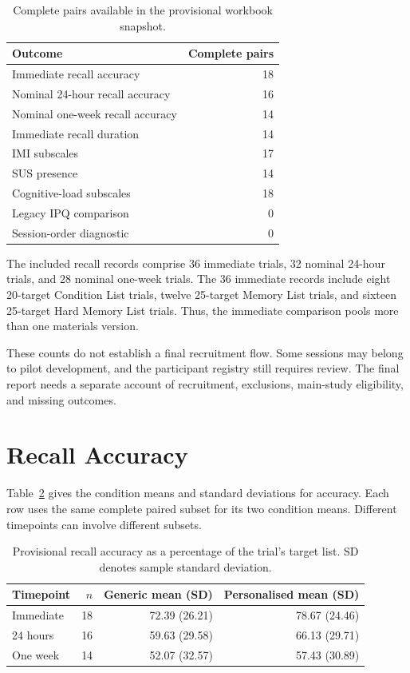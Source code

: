\begin{table}[htbp]
\centering
\caption{Complete pairs available in the provisional workbook snapshot.}
\label{tab:coverage}
\begin{tabular}{lr}
\toprule
Outcome & Complete pairs \\
\midrule
Immediate recall accuracy & 18 \\
Nominal 24-hour recall accuracy & 16 \\
Nominal one-week recall accuracy & 14 \\
Immediate recall duration & 14 \\
IMI subscales & 17 \\
SUS presence & 14 \\
Cognitive-load subscales & 18 \\
Legacy IPQ comparison & 0 \\
Session-order diagnostic & 0 \\
\bottomrule
\end{tabular}
\end{table}

The included recall records comprise 36 immediate trials, 32 nominal 24-hour trials, and 28 nominal one-week trials. The 36 immediate records include eight 20-target Condition List trials, twelve 25-target Memory List trials, and sixteen 25-target Hard Memory List trials. Thus, the immediate comparison pools more than one materials version.

These counts do not establish a final recruitment flow. Some sessions may belong to pilot development, and the participant registry still requires review. The final report needs a separate account of recruitment, exclusions, main-study eligibility, and missing outcomes.

\section{Recall Accuracy}
Table~\ref{tab:recallmeans} gives the condition means and standard deviations for accuracy. Each row uses the same complete paired subset for its two condition means. Different timepoints can involve different subsets.

\begin{table}[htbp]
\centering
\small
\caption{Provisional recall accuracy as a percentage of the trial's target list. SD denotes sample standard deviation.}
\label{tab:recallmeans}
\begin{tabular}{lrrr}
\toprule
Timepoint & $n$ & Generic mean (SD) & Personalised mean (SD) \\
\midrule
Immediate & 18 & 72.39 (26.21) & 78.67 (24.46) \\
24 hours & 16 & 59.63 (29.58) & 66.13 (29.71) \\
One week & 14 & 52.07 (32.57) & 57.43 (30.89) \\
\bottomrule
\end{tabular}
\end{table}

